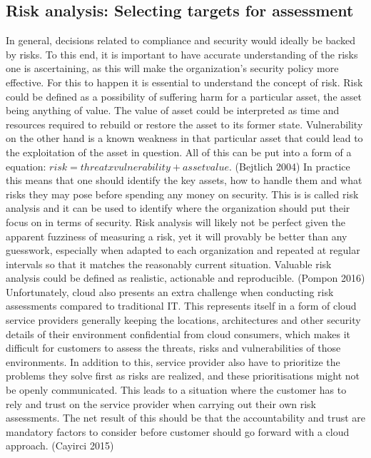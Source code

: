 \documentclass{article}
\begin{document}
\subsection{Risk analysis: Selecting targets for assessment}
In general, decisions related to compliance and security would ideally be backed by risks. To this end, it is important to have accurate understanding of the risks one is ascertaining, as this will make the organization's security policy more effective.
For this to happen it is essential to understand the concept of risk. Risk could be defined as a possibility of suffering harm for a particular asset, the asset being anything of value. The value of asset could be interpreted as time and resources required to rebuild or restore the asset to its former state. Vulnerability on the other hand is a known weakness in that particular asset that could lead to the exploitation of the asset in question. All of this can be put into a form of a equation: $risk = threat x vulnerability + asset value$. (Bejtlich 2004)
In practice this means that one should identify the key assets, how to handle them and what risks they may pose before spending any money on security. This is is called risk analysis and it can be used to identify where the organization should put their focus on in terms of security. Risk analysis will likely not be perfect given the apparent fuzziness of measuring a risk, yet it will provably be better than any guesswork, especially when adapted to each organization and repeated at regular intervals so that it matches the reasonably current situation. Valuable risk analysis could be defined as realistic, actionable and reproducible. (Pompon 2016)
Unfortunately, cloud also presents an extra challenge when conducting risk assessments compared to traditional IT. This represents itself in a form of cloud service providers generally keeping the locations, architectures and other security details of their environment confidential from cloud consumers, which makes it difficult for customers to assess the threats, risks and vulnerabilities of those environments. In addition to this, service provider also have to prioritize the problems they solve first as risks are realized, and these prioritisations might not be openly communicated. This leads to a situation where the customer has to rely and trust on the service provider when carrying out their own risk assessments. The net result of this should be that the accountability and trust are mandatory factors to consider before customer should go forward with a cloud approach. (Cayirci 2015)
\par
\end{document}
